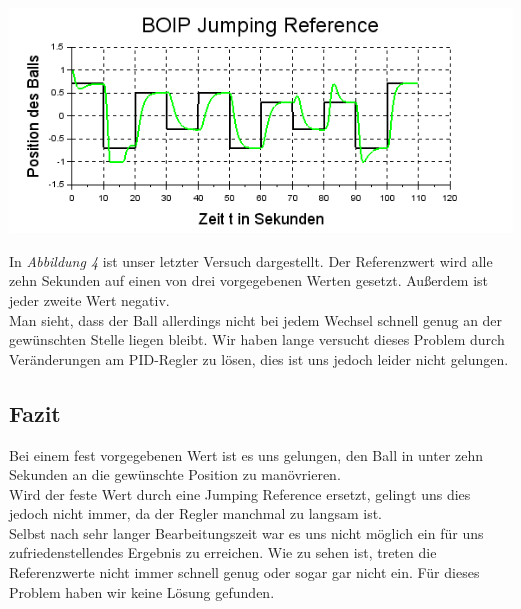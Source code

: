 \begin{center}
	\begin{minipage}{\linewidth}
	\centering
	\includegraphics[scale=0.7]{images/jumpingref.png}
	\end{minipage}
\end{center}
In \textit{Abbildung 4} ist unser letzter Versuch dargestellt. Der Referenzwert wird alle zehn Sekunden auf einen von drei vorgegebenen Werten gesetzt. Außerdem ist jeder zweite Wert negativ.\\
Man sieht, dass der Ball allerdings nicht bei jedem Wechsel schnell genug an der gewünschten Stelle liegen bleibt. Wir haben lange versucht dieses Problem durch Veränderungen am PID-Regler zu lösen, dies ist uns jedoch leider nicht gelungen.


\subsection{Fazit}
Bei einem fest vorgegebenen Wert ist es uns gelungen, den Ball in unter zehn Sekunden an die gewünschte Position zu manövrieren. \\
Wird der feste Wert durch eine Jumping Reference ersetzt, gelingt uns dies jedoch nicht immer, da der Regler manchmal zu langsam ist.\\
Selbst nach sehr langer Bearbeitungszeit war es uns nicht möglich ein für uns zufriedenstellendes Ergebnis zu erreichen. Wie zu sehen ist, treten die Referenzwerte nicht immer schnell genug oder sogar gar nicht ein. Für dieses Problem haben wir keine Lösung gefunden.